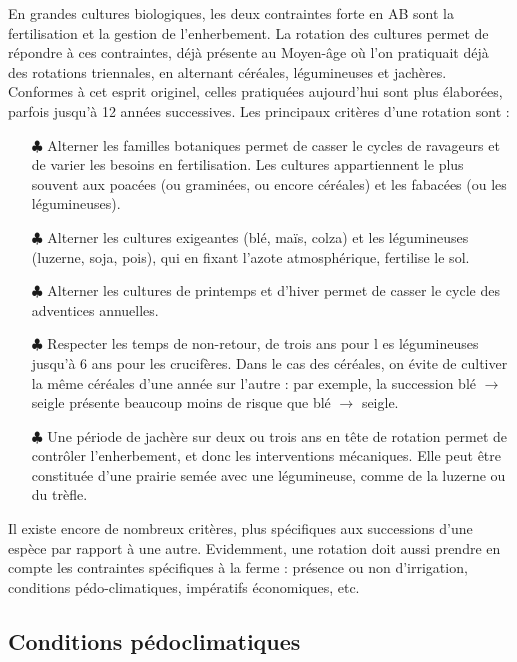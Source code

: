 \documentclass{book}
\begin{document}
En grandes cultures biologiques, les deux contraintes forte en AB sont la fertilisation et la gestion de l'enherbement. La rotation des cultures permet de répondre à ces contraintes, déjà présente au Moyen-âge où l'on pratiquait déjà des rotations triennales, en alternant céréales, légumineuses et jachères. Conformes à cet esprit originel, celles pratiquées aujourd'hui sont plus élaborées, parfois jusqu'à 12 années successives. Les principaux critères d'une rotation sont :
\begin{itemize}

	\item[$\clubsuit$] Alterner les familles botaniques permet de casser le cycles de ravageurs et de varier les besoins en fertilisation. Les cultures appartiennent le plus souvent aux poacées (ou graminées, ou encore céréales) et les fabacées (ou les légumineuses). 

	\item[$\clubsuit$] Alterner les cultures exigeantes (blé, maïs, colza) et les légumineuses (luzerne, soja, pois), qui en fixant l'azote atmosphérique, fertilise le sol. 
	
	\item[$\clubsuit$] Alterner les cultures de printemps et d'hiver permet de casser le cycle des adventices annuelles.
	
	\item[$\clubsuit$] Respecter les temps de non-retour, de trois ans pour l es légumineuses jusqu'à 6 ans pour les crucifères. Dans le cas des céréales, on évite de cultiver la même céréales d'une année sur l'autre : par exemple, la succession blé $\rightarrow$ seigle présente beaucoup moins de risque que blé $\rightarrow$ seigle.
	
	\item[$\clubsuit$] Une période de jachère sur deux ou trois ans en tête de rotation permet de contrôler l'enherbement, et donc les interventions mécaniques. Elle peut être constituée d'une prairie semée avec une légumineuse, comme de la luzerne ou du trèfle.

\end{itemize}

Il existe encore de nombreux critères, plus spécifiques aux successions d'une espèce par rapport à une autre. Evidemment, une rotation doit aussi prendre en compte les contraintes spécifiques à la ferme : présence ou non d'irrigation, conditions pédo-climatiques, impératifs économiques, etc.

\subsection{Conditions pédoclimatiques}
\end{document}
